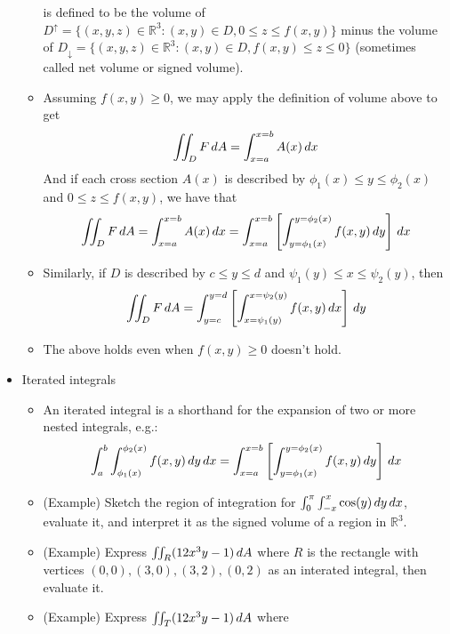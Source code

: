\documentclass[11pt]{article}
\begin{document}
\begin{itemize}
\begin{itemize}
      is defined to be the volume of
      \(D^\uparrow=\{(x,y,z)\in\mathbb R^3:(x,y)\in D,0\leq z\leq f(x,y)\}\)
      minus the volume of
      \(D_\downarrow=\{(x,y,z)\in\mathbb R^3:(x,y)\in D,f(x,y)\leq z\leq 0\}\)
      (sometimes called net volume or signed volume).
      \item Assuming \(f(x,y)\geq 0\), we may apply the definition of volume
      above to get
        \[
          \iint_D F\,d A
            =
          \int_{x=a}^{x=b}
          A(x)
          \,d x
        \]
      And if each cross section \(A(x)\) is described by \(\phi_1(x)\leq y\leq\phi_2(x)\)
      and \(0\leq z\leq f(x,y)\),
      we have that
        \[
          \iint_D F\,d A
            =
          \int_{x=a}^{x=b}
          A(x)
          \,d x
            =
          \int_{x=a}^{x=b}
          \left[
          \int_{y=\phi_1(x)}^{y=\phi_2(x)}
          f(x,y) \,d y
          \right] \,d x
        \]
      \item Similarly, if \(D\) is described by \(c\leq y\leq d\) and
        \(\psi_1(y)\leq x\leq \psi_2(y)\), then
        \[
          \iint_D F\,d A
            =
          \int_{y=c}^{y=d}
          \left[
          \int_{x=\psi_1(y)}^{x=\psi_2(y)}
          f(x,y) \,d x
          \right] \,d y
        \]
      \item The above holds even when \(f(x,y)\geq 0\) doesn't hold.
    \end{itemize}
  \item Iterated integrals
    \begin{itemize}
      \item An iterated integral is a shorthand for the expansion of two
        or more nested integrals, e.g.:
        \[
          \int_a^b
          \int_{\phi_1(x)}^{\phi_2(x)}
          f(x,y)
          \,d y\,d x
            =
          \int_{x=a}^{x=b}
          \left[
          \int_{y=\phi_1(x)}^{y=\phi_2(x)}
          f(x,y) \,d y
          \right] \,d x
        \]
      \item (Example) Sketch the region of integration for
            \(\int_0^\pi\int_{-x}^x \cos(y)\,d y\,d x\),
            evaluate it,
            and interpret it as the signed volume of a region in \(\mathbb R^3\).
      \item (Example) Express \(\iint_R (12x^3y-1)\,d A\) where
            \(R\) is the
            rectangle with vertices \((0,0),(3,0),(3,2),(0,2)\)
            as an interated integral, then evaluate it.
      \item (Example) Express \(\iint_T (12x^3y-1)\,d A\) where

\end{itemize}
\end{itemize}
\end{document}
